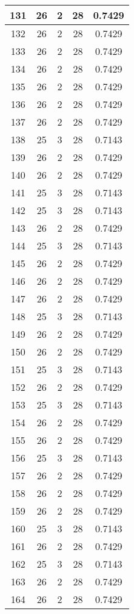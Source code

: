 \documentclass[letterpaper, 12pt]{article}
\begin{document}
\begin{longtable}{|c|c|c|c|c|}
\hline
131 & 26 & 2 & 28 & 0.7429 \\
\hline
132 & 26 & 2 & 28 & 0.7429 \\
\hline
133 & 26 & 2 & 28 & 0.7429 \\
\hline
134 & 26 & 2 & 28 & 0.7429 \\
\hline
135 & 26 & 2 & 28 & 0.7429 \\
\hline
136 & 26 & 2 & 28 & 0.7429 \\
\hline
137 & 26 & 2 & 28 & 0.7429 \\
\hline
138 & 25 & 3 & 28 & 0.7143 \\
\hline
139 & 26 & 2 & 28 & 0.7429 \\
\hline
140 & 26 & 2 & 28 & 0.7429 \\
\hline
141 & 25 & 3 & 28 & 0.7143 \\
\hline
142 & 25 & 3 & 28 & 0.7143 \\
\hline
143 & 26 & 2 & 28 & 0.7429 \\
\hline
144 & 25 & 3 & 28 & 0.7143 \\
\hline
145 & 26 & 2 & 28 & 0.7429 \\
\hline
146 & 26 & 2 & 28 & 0.7429 \\
\hline
147 & 26 & 2 & 28 & 0.7429 \\
\hline
148 & 25 & 3 & 28 & 0.7143 \\
\hline
149 & 26 & 2 & 28 & 0.7429 \\
\hline
150 & 26 & 2 & 28 & 0.7429 \\
\hline
151 & 25 & 3 & 28 & 0.7143 \\
\hline
152 & 26 & 2 & 28 & 0.7429 \\
\hline
153 & 25 & 3 & 28 & 0.7143 \\
\hline
154 & 26 & 2 & 28 & 0.7429 \\
\hline
155 & 26 & 2 & 28 & 0.7429 \\
\hline
156 & 25 & 3 & 28 & 0.7143 \\
\hline
157 & 26 & 2 & 28 & 0.7429 \\
\hline
158 & 26 & 2 & 28 & 0.7429 \\
\hline
159 & 26 & 2 & 28 & 0.7429 \\
\hline
160 & 25 & 3 & 28 & 0.7143 \\
\hline
161 & 26 & 2 & 28 & 0.7429 \\
\hline
162 & 25 & 3 & 28 & 0.7143 \\
\hline
163 & 26 & 2 & 28 & 0.7429 \\
\hline
164 & 26 & 2 & 28 & 0.7429 \\

\end{longtable}
\end{document}
